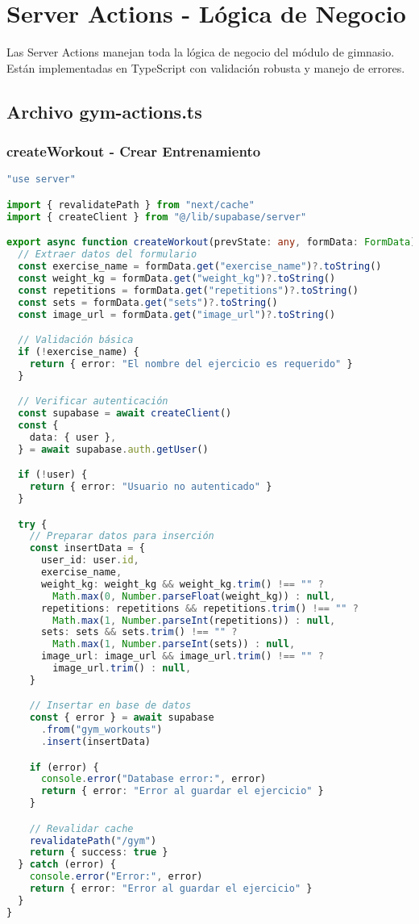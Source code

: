 \documentclass[12pt,a4paper]{article}
\begin{document}
\section{Server Actions - Lógica de Negocio}

Las Server Actions manejan toda la lógica de negocio del módulo de gimnasio. Están implementadas en TypeScript con validación robusta y manejo de errores.

\subsection{Archivo gym-actions.ts}

\subsubsection{createWorkout - Crear Entrenamiento}

\begin{lstlisting}[language=typescript, caption=Función createWorkout completa]
"use server"

import { revalidatePath } from "next/cache"
import { createClient } from "@/lib/supabase/server"

export async function createWorkout(prevState: any, formData: FormData) {
  // Extraer datos del formulario
  const exercise_name = formData.get("exercise_name")?.toString()
  const weight_kg = formData.get("weight_kg")?.toString()
  const repetitions = formData.get("repetitions")?.toString()
  const sets = formData.get("sets")?.toString()
  const image_url = formData.get("image_url")?.toString()

  // Validación básica
  if (!exercise_name) {
    return { error: "El nombre del ejercicio es requerido" }
  }

  // Verificar autenticación
  const supabase = await createClient()
  const {
    data: { user },
  } = await supabase.auth.getUser()

  if (!user) {
    return { error: "Usuario no autenticado" }
  }

  try {
    // Preparar datos para inserción
    const insertData = {
      user_id: user.id,
      exercise_name,
      weight_kg: weight_kg && weight_kg.trim() !== "" ? 
        Math.max(0, Number.parseFloat(weight_kg)) : null,
      repetitions: repetitions && repetitions.trim() !== "" ? 
        Math.max(1, Number.parseInt(repetitions)) : null,
      sets: sets && sets.trim() !== "" ? 
        Math.max(1, Number.parseInt(sets)) : null,
      image_url: image_url && image_url.trim() !== "" ? 
        image_url.trim() : null,
    }

    // Insertar en base de datos
    const { error } = await supabase
      .from("gym_workouts")
      .insert(insertData)

    if (error) {
      console.error("Database error:", error)
      return { error: "Error al guardar el ejercicio" }
    }

    // Revalidar cache
    revalidatePath("/gym")
    return { success: true }
  } catch (error) {
    console.error("Error:", error)
    return { error: "Error al guardar el ejercicio" }
  }
}
\end{lstlisting}
\end{document}
